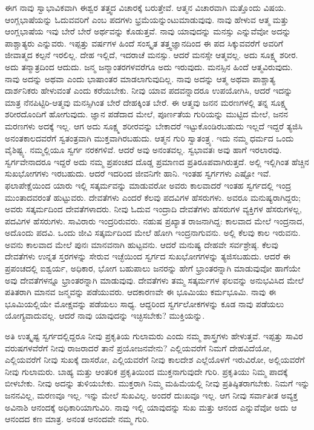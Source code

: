 ಈಗ ನಾವು ಸ್ವಾಭಾವಿಕವಾಗಿ ಈಶ್ವರ ತತ್ತ್ವದ ವಿಚಾರಕ್ಕೆ ಬರುತ್ತೇವೆ. ಆತ್ಮನ ವಿಚಾರವಾಗಿ ಮತ್ತೊಂದು ವಿಷಯ. ಆಂಗ್ಲಭಾಷೆಯನ್ನು ಓದುವವರಿಗೆ  ಎಂಬ ಪದಗಳು ಭ್ರಮೆಯನ್ನುಂಟುಮಾಡುವುವು. ನಾವು ಹೇಳುವ ಆತ್ಮ ಮತ್ತು ಆಂಗ್ಲಭಾಷೆಯ ಇವು ಬೇರೆ ಬೇರೆ ಅರ್ಥವನ್ನು ಕೊಡುತ್ತವೆ. ನಾವು ಯಾವುದನ್ನು ಮನಸ್ಸು  ಎನ್ನುವೆವೋ ಅದನ್ನು ಪಾಶ್ಚಾತ್ಯರು  ಎನ್ನುವರು. ಇಪ್ಪತ್ತು ವರ್ಷಗಳ ಹಿಂದೆ ಸಂಸ್ಕೃತ ತತ್ತ್ವಜ್ಞಾನದಿಂದ ಈ ಪದ ಸಿಕ್ಕುವವರೆಗೆ ಅವರಿಗೆ ಜೀವಾತ್ಮದ ಕಲ್ಪನೆ ಇರಲಿಲ್ಲ. ದೇಹ ಇಲ್ಲಿದೆ, ಇದರಾಚೆ ಮನಸ್ಸು. ಆದರೆ ಮನಸ್ಸೇ ಆತ್ಮವಲ್ಲ. ಅದು ಸೂಕ್ಷ್ಮ ಶರೀರ. ಅದು ತನ್ಮಾತ್ರದಿಂದ ಆದುದು. ಜನ್ಮ ಜನ್ಮಾಂತರಗಳವರೆಗೂ ಅದು ಇರುವುದು. ಮನಸ್ಸಿನ ಹಿಂದೆ ಆತ್ಮವಿರುವುದು. ನಾವು ಅದನ್ನು  ಅಥವಾ  ಎಂದು ಭಾಷಾಂತರ ಮಾಡಲಾಗುವುದಿಲ್ಲ. ನಾವು ಅದನ್ನು ಆತ್ಮ ಅಥವಾ ಪಾಶ್ಚಾತ್ಯ ದಾರ್ಶನಿಕರು ಹೇಳುವಂತೆ  ಎಂದು ಕರೆಯಬೇಕು. ನೀವು ಯಾವ ಪದವನ್ನಾದರೂ ಉಪಯೋಗಿಸಿ, ಆದರೆ ಇದನ್ನು ಮಾತ್ರ ನೆನಪಿಟ್ಟಿರಿ-ಆತ್ಮವು ಮನಸ್ಸಿಗಿಂತ ಬೇರೆ ದೇಹಕ್ಕಿಂತ ಬೇರೆ. ಈ ಆತ್ಮವು ಜನನ ಮರಣಗಳಲ್ಲಿ ತನ್ನ ಸೂಕ್ಷ್ಮ ಶರೀರದೊಂದಿಗೆ ಹೋಗುವುದು. ಜ್ಞಾನ ಪಡೆದಾದ ಮೇಲೆ, ಪೂರ್ಣತೆಯ ಗುರಿಯನ್ನು ಮುಟ್ಟಿದ ಮೇಲೆ, ಜನನ ಮರಣಗಳು ಅದಕ್ಕೆ ಇಲ್ಲ. ಆಗ ಅದು ಸೂಕ್ಷ್ಮ ಶರೀರವನ್ನು ಬೇಕಾದರೆ ಇಟ್ಟುಕೊಂಡಿರಬಹುದು ಇಲ್ಲದೆ ಇದ್ದರೆ ತ್ಯಜಿಸಿ ಅನಂತಕಾಲದವರೆಗೆ ಸ್ವತಂತ್ರವಾಗಿ ಮುಕ್ತವಾಗಿರಬಹುದು. ಆತ್ಮನ ಗುರಿ ಸ್ವಾತಂತ್ರ್ಯ. ಇದು ನಮ್ಮ ಧರ್ಮದ ಒಂದು ವೈಶಿಷ್ಟ್ಯ. ನಮ್ಮಲ್ಲಿಯೂ ಸ್ವರ್ಗ ನರಕಗಳಿವೆ. ಆದರೆ ಅವು ಅನಂತವಲ್ಲ. ಸ್ವಭಾವತಃ ಅವು ಹಾಗೆ ಇರಲಾರವು. ಸ್ವರ್ಗವೇನಾದರೂ ಇದ್ದರೆ ಅದು ನಮ್ಮ ಪ್ರಪಂಚದ ದೊಡ್ಡ ಪ್ರಮಾಣದ ಪ್ರತಿರೂಪವಾಗಿರುತ್ತದೆ. ಅಲ್ಲಿ ಇಲ್ಲಿಗಿಂತ ಹೆಚ್ಚಿನ ಸುಖಭೋಗಗಳು ಇರಬಹುದು. ಆದರೆ ಇದರಿಂದ ಜೀವನಿಗೇ ಹಾನಿ. ಇಂತಹ ಸ್ವರ್ಗಗಳು ಎಷ್ಟೋ ಇವೆ. ಫಲಾಪೇಕ್ಷೆಯಿಂದ ಯಾರು ಇಲ್ಲಿ ಸತ್ಕರ್ಮವನ್ನು ಮಾಡುವರೋ ಅವರು ಕಾಲವಾದರೆ ಇಂತಹ ಸ್ವರ್ಗದಲ್ಲಿ ಇಂದ್ರ ಮುಂತಾದವರಂತೆ ಹುಟ್ಟುವರು. ದೇವತೆಗಳು ಎಂದರೆ ಕೆಲವು ಪದವಿಗಳ ಹೆಸರುಗಳು. ಅವರೂ ಮನುಷ್ಯರಾಗಿದ್ದರು; ಅವರು ಸತ್ಕರ್ಮದಿಂದ ದೇವತೆಗಳಾದರು. ನೀವು ಓದುವ ಇಂದ್ರಾದಿ ದೇವತೆಗಳು ಹೆಸರುಗಳ ವ್ಯಕ್ತಿಗಳ ಹೆಸರುಗಳಲ್ಲ, ಪದವಿಗಳ ಹೆಸರುಗಳು. ಸಾವಿರಾರು ಇಂದ್ರರಿರುವರು. ನಹುಷ ಪ್ರಖ್ಯಾತ ರಾಜನಾಗಿದ್ದ: ಕಾಲವಾದ ಮೇಲೆ ಇಂದ್ರನಾದ, ಅದೊಂದು ಪದವಿ. ಒಂದು ಜೀವಿ ಸತ್ಕರ್ಮದಿಂದ ಮೇಲೆ ಹೋಗಿ ಇಂದ್ರನಾಗುವನು. ಅಲ್ಲಿ ಕೆಲವು ಕಾಲ ಇರುವನು. ಅವನು ಕಾಲವಾದ ಮೇಲೆ ಪುನಃ ಮಾನವನಾಗಿ ಹುಟ್ಟವನು. ಆದರೆ ಮನುಷ್ಯ ದೇಹವೇ ಸರ್ವಶ್ರೇಷ್ಠ. ಕೆಲವು ದೇವತೆಗಳು ಉನ್ನತ ಸ್ತರಗಳನ್ನು ಸೇರುವ ಇಚ್ಛೆಯಿಂದ ಸ್ವರ್ಗದ ಸುಖಭೋಗಗಳನ್ನು ತ್ಯಜಿಸಬಹುದು. ಆದರೆ ಈ ಪ್ರಪಂಚದಲ್ಲಿ ಐಶ್ವರ್ಯ, ಅಧಿಕಾರ, ಭೋಗ ಬಹುಪಾಲು ಜನರನ್ನು ಹೇಗೆ ಭ್ರಾಂತರನ್ನಾಗಿ ಮಾಡುವುವೋ ಹಾಗೆಯೇ ಅವು ದೇವತೆಗಳನ್ನೂ ಭ್ರಾಂತರನ್ನಾಗಿ ಮಾಡುವುವು. ದೇವತೆಗಳು ತಮ್ಮ ಸತ್ಕರ್ಮಗಳ ಫಲವನ್ನು ಅನುಭವಿಸಿದ ಮೇಲೆ ಪತಿತರಾಗಿ ಮಾನವ ಜನ್ಮವನ್ನು ಪಡೆಯುವರು. ಆದಕಾರಣವೇ ಈ ಭೂಮಿಯು ಕರ್ಮಭೂಮಿ. ನಾವು ಈ ಭೂಮಿಯಲ್ಲಿಯೇ ಮೋಕ್ಷವನ್ನು ಪಡೆಯಲು ಸಾಧ್ಯ. ಆದ್ದರಿಂದ ಸ್ವರ್ಗಲೋಕಗಳನ್ನು ಕೂಡ ನಾವು ಪಡೆಯಲು ಯೋಗ್ಯವಾದುವಲ್ಲ. ಆದರೆ ನಾವು ಯಾವುದನ್ನು ಇಚ್ಛಿಸಬೇಕು? ಮುಕ್ತಿಯನ್ನು.

ಅತಿ ಉತ್ಕೃಷ್ಟ ಸ್ವರ್ಗದಲ್ಲಿದ್ದರೂ ನೀವು ಪ್ರಕೃತಿಯ ಗುಲಾಮರು ಎಂದು ನಮ್ಮ ಶಾಸ್ತ್ರಗಳು ಹೇಳುತ್ತವೆ. ಇಪ್ಪತ್ತು ಸಾವಿರ ವರುಷಗಳವೆರೆಗೆ ನೀವು ರಾಜರಾದರೆ ತಾನೆ ಪ್ರಯೋಜನವೇನು? ಎಲ್ಲಿಯವರೆಗೆ ನಿಮಗೆ ದೇಹವಿದೆಯೋ, ಎಲ್ಲಿಯವರೆಗೆ ನೀವು ಸುಖಕ್ಕೆ ದಾಸರೋ, ಎಲ್ಲಿಯವರೆಗೆ ನೀವು ಕಾಲದೇಶ ಎಲ್ಲೆಯೊಳಗೆ ಇರುವಿರೋ, ಅಲ್ಲಿಯವರೆಗೆ ನೀವು ಗುಲಾಮರು. ಬಾಹ್ಯ ಮತ್ತು ಆಂತರಿಕ ಪ್ರಕೃತಿಯಿಂದ ಮುಕ್ತನಾಗುವುದೇ ಗುರಿ. ಪ್ರಕೃತಿಯು ನಿಮ್ಮ ಪಾದಕ್ಕೆ ಬೀಳಬೇಕು. ನೀವು ಅದನ್ನು ತುಳಿಯಬೇಕು. ಮುಕ್ತರಾಗಿ ನಿಮ್ಮ ಮಹಿಮೆಯಲ್ಲಿ ನೀವು ಪ್ರತಿಷ್ಠಿತರಾಗಬೇಕು. ನಿಮಗೆ ಇನ್ನು ಜನನವಿಲ್ಲ, ಮರಣವೂ ಇಲ್ಲ. ಇನ್ನು ಮೇಲೆ ಸುಖವಿಲ್ಲ. ಅಂದರೆ ದುಃಖವೂ ಇಲ್ಲ. ಆಗ ನೀವು ಸರ್ವಾತೀತ ಅವ್ಯಕ್ತ ಅವಿನಾಶಿ ಆನಂದಕ್ಕೆ ಅಧಿಕಾರಿಯಾಗುವಿರಿ. ನಾವು ಇಲ್ಲಿ ಯಾವುದನ್ನು ಸುಖ ಮತ್ತು ಆನಂದ ಎನ್ನುವೆವೋ ಅದು ಆ ಆನಂದದ ಕಣ ಮಾತ್ರ. ಅನಂತ ಆನಂದವೇ ನಮ್ಮ ಗುರಿ.

